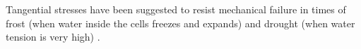 Tangential stresses have been suggested to resist mechanical failure in times of
frost (when water inside the cells freezes and expands) and drought (when water
tension is very high) \cite{kubler1983mechanism}.